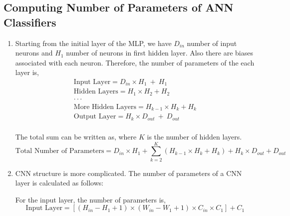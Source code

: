 \documentclass[3p,times,procedia]{elsarticle}
\begin{document}
\subsection{\textbf{Computing Number of Parameters of ANN Classifiers}}
\begin{enumerate}
    \item Starting from the initial layer of the MLP, we have $D_{in}$ number of input neurons and $H_1$ number of neurons in first hidden layer. Also there are biases associated with 
each neuron. Therefore, the number of parameters of the each layer is,
    \vspace{-0.5cm}
    \begin{equation*}
    \begin{array}{r}
    \textrm{Input Layer} = D_{in} \times H_{1} \ +\ H_{1} \\
    \textrm{Hidden Layers}= H_1 \times H_2 + H_2\\
    \cdot \cdot \cdot \hspace{2em} \\
    \textrm{More Hidden Layers} = H_{k-1} \times H_k + H_k\\
    \textrm{Output Layer} = H_{k} \times D_{out} \ +\ D_{out} \\
    \end{array}
    \end{equation*}

    \vspace{-0.25cm}
    The total sum can be written as, where $K$ is the number of hidden layers.
    \vspace{-0.5cm}
    \begin{equation*}
        \textrm{Total Number of Parameters} = D_{in}\times H_1 + \sum_{k=2}^{K} (H_{k-1} \times H_k + H_k) + H_k \times D_{out} +  D_{out}
    \end{equation*}
    \vspace{-0.25cm}

    \item CNN structure is more complicated. The number of parameters of a CNN layer is calculated as follows:
    
    For the input layer, the number of parameters is,
    \vspace{-0.5cm}
    \begin{equation*}
        \textrm{Input Layer} = [(H_{in}-H_1+1) \times (W_{in}-W_1+1)\times C_{in} \times C_1 ]+ C_1
    \end{equation*}


\end{enumerate}
\end{document}

